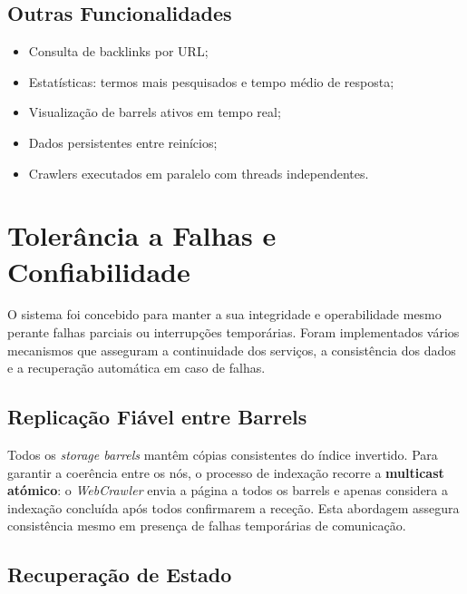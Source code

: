\documentclass{article}
\begin{document}
\subsection{Outras Funcionalidades}

\begin{itemize}
    \item Consulta de backlinks por URL;
    \item Estatísticas: termos mais pesquisados e tempo médio de resposta;
    \item Visualização de barrels ativos em tempo real;
    \item Dados persistentes entre reinícios;
    \item Crawlers executados em paralelo com threads independentes.
\end{itemize}





















\newpage
\section{Tolerância a Falhas e Confiabilidade}

O sistema foi concebido para manter a sua integridade e operabilidade mesmo perante falhas parciais ou interrupções temporárias. Foram implementados vários mecanismos que asseguram a continuidade dos serviços, a consistência dos dados e a recuperação automática em caso de falhas.

\subsection{Replicação Fiável entre Barrels}

Todos os \textit{storage barrels} mantêm cópias consistentes do índice invertido. Para garantir a coerência entre os nós, o processo de indexação recorre a \textbf{multicast atómico}: o \textit{WebCrawler} envia a página a todos os barrels e apenas considera a indexação concluída após todos confirmarem a receção. Esta abordagem assegura consistência mesmo em presença de falhas temporárias de comunicação.

\subsection{Recuperação de Estado}
\end{document}
